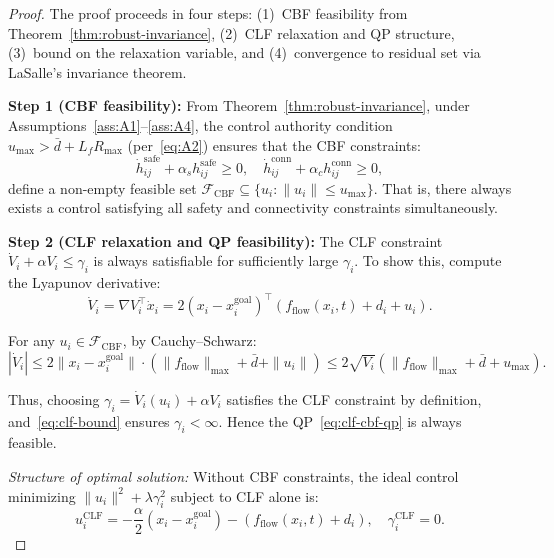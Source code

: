 \begin{proof}
The proof proceeds in four steps: (1)~CBF feasibility from Theorem~\ref{thm:robust-invariance}, (2)~CLF relaxation and QP structure, (3)~bound on the relaxation variable, and (4)~convergence to residual set via LaSalle's invariance theorem.

\medskip
\noindent\textbf{Step 1 (CBF feasibility):}
From Theorem~\ref{thm:robust-invariance}, under Assumptions~\ref{ass:A1}--\ref{ass:A4}, the control authority condition $u_{\max}>\bar{d}+L_fR_{\max}$ (per~\eqref{eq:A2}) ensures that the CBF constraints:
\begin{equation}
\dot{h}_{ij}^{\mathrm{safe}} + \alpha_s h_{ij}^{\mathrm{safe}} \ge 0, \quad \dot{h}_{ij}^{\mathrm{conn}} + \alpha_c h_{ij}^{\mathrm{conn}} \ge 0,
\label{eq:cbf-constraints-t2}
\end{equation}
define a non-empty feasible set $\mathcal{F}_{\mathrm{CBF}}\subseteq\{u_i:\|u_i\|\le u_{\max}\}$. That is, there always exists a control satisfying all safety and connectivity constraints simultaneously.

\medskip
\noindent\textbf{Step 2 (CLF relaxation and QP feasibility):}
The CLF constraint $\dot{V}_i+\alpha V_i\le\gamma_i$ is always satisfiable for sufficiently large $\gamma_i$. To show this, compute the Lyapunov derivative:
\begin{equation}
\dot{V}_i = \nabla V_i^\top\dot{x}_i = 2(x_i-x_i^{\mathrm{goal}})^\top(f_{\mathrm{flow}}(x_i,t)+d_i+u_i).
\label{eq:clf-derivative}
\end{equation}

For any $u_i\in\mathcal{F}_{\mathrm{CBF}}$, by Cauchy--Schwarz:
\begin{equation}
|\dot{V}_i| \le 2\|x_i-x_i^{\mathrm{goal}}\|\cdot(\|f_{\mathrm{flow}}\|_{\max}+\bar{d}+\|u_i\|) \le 2\sqrt{V_i}(\|f_{\mathrm{flow}}\|_{\max}+\bar{d}+u_{\max}).
\label{eq:clf-bound}
\end{equation}

Thus, choosing $\gamma_i=\dot{V}_i(u_i)+\alpha V_i$ satisfies the CLF constraint by definition, and~\eqref{eq:clf-bound} ensures $\gamma_i<\infty$. Hence the QP~\eqref{eq:clf-cbf-qp} is always feasible.

\emph{Structure of optimal solution:}
Without CBF constraints, the ideal control minimizing $\|u_i\|^2+\lambda\gamma_i^2$ subject to CLF alone is:
\begin{equation}
u_i^{\mathrm{CLF}} = -\frac{\alpha}{2}(x_i-x_i^{\mathrm{goal}}) - (f_{\mathrm{flow}}(x_i,t)+d_i), \quad \gamma_i^{\mathrm{CLF}}=0.
\label{eq:ideal-clf}
\end{equation}


\end{proof}
